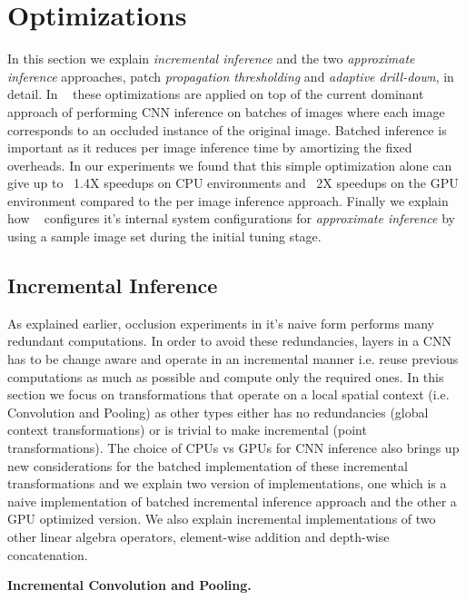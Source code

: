 \section{Optimizations}

In this section we explain \textit{incremental inference} and the two \textit{approximate inference} approaches, patch \textit{propagation thresholding} and \textit{adaptive drill-down}, in detail.
In \system~ these optimizations are applied on top of the current dominant approach of performing CNN inference on batches of images where each image corresponds to an occluded instance of the original image.
Batched inference is important as it reduces per image inference time by amortizing the fixed overheads.
In our experiments we found that this simple optimization alone can give up to ~1.4X speedups on CPU environments and ~2X speedups on the GPU environment compared to the per image inference approach.
Finally we explain how \system~ configures it's internal system configurations for \textit{approximate inference} by using a sample image set during the initial tuning stage.

\subsection{Incremental Inference}\label{sec:inc_computation}

As explained earlier, occlusion experiments in it's naive form performs many redundant computations.
In order to avoid these redundancies, layers in a CNN has to be change aware and operate in an incremental manner i.e. reuse previous computations as much as possible and compute only the required ones.
In this section we focus on transformations that operate on a local spatial context (i.e. Convolution and Pooling) as other types either has no redundancies (global context transformations) or is trivial to make incremental (point transformations).
The choice of CPUs vs GPUs for CNN inference also brings up new considerations for the batched implementation of these incremental transformations and we explain two version of implementations, one which is a naive implementation of batched incremental inference approach and the other a GPU optimized version.
We also explain incremental implementations of two other linear algebra operators, element-wise addition and depth-wise concatenation.

\vspace{2mm}
\noindent \textbf{Incremental Convolution and Pooling.}


